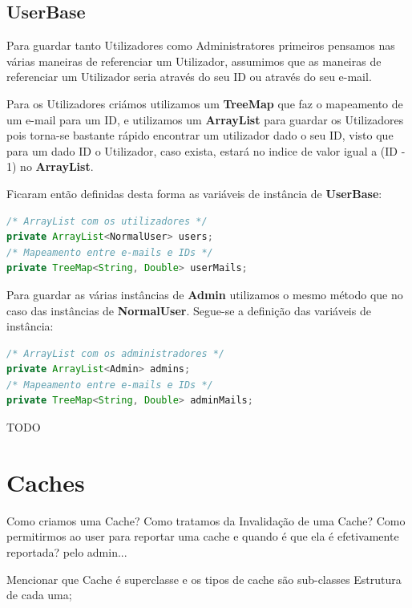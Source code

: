 \documentclass{article}
\begin{document}
\subsection{UserBase}
\par Para guardar tanto Utilizadores como Administratores primeiros pensamos nas várias maneiras de referenciar um 
Utilizador, assumimos que as maneiras de referenciar um Utilizador seria através do seu ID ou através do seu e-mail.
\par Para os Utilizadores criámos utilizamos um \textbf{TreeMap} que faz o mapeamento de um e-mail para um ID, e 
utilizamos um \textbf{ArrayList} para guardar os Utilizadores pois torna-se bastante rápido encontrar um utilizador dado o
seu ID, visto que para um dado ID o Utilizador, caso exista, estará no indice de valor igual a (ID - 1) no \textbf{ArrayList}.
\par Ficaram então definidas desta forma as variáveis de instância de \textbf{UserBase}:
\begin{lstlisting}[language=Java]
/* ArrayList com os utilizadores */
private ArrayList<NormalUser> users;
/* Mapeamento entre e-mails e IDs */
private TreeMap<String, Double> userMails;
\end{lstlisting}

\par Para guardar as várias instâncias de \textbf{Admin} utilizamos o mesmo método que no caso das instâncias de
\textbf{NormalUser}. Segue-se a definição das variáveis de instância:
\begin{lstlisting}[language=Java]
/* ArrayList com os administradores */
private ArrayList<Admin> admins;
/* Mapeamento entre e-mails e IDs */
private TreeMap<String, Double> adminMails;
\end{lstlisting}













\pagebreak

TODO
\section{ Caches }
Como criamos uma Cache?
Como tratamos da Invalidação de uma Cache?
Como permitirmos ao user para reportar uma cache e quando é que ela é efetivamente reportada? pelo admin... 

Mencionar que Cache é superclasse e os tipos de cache são sub-classes Estrutura de cada uma;
\end{document}
